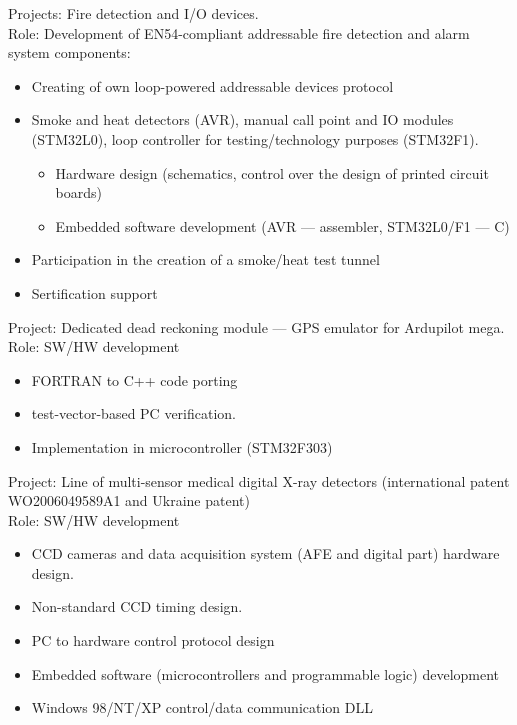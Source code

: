 \documentclass[11pt,a4paper]{moderncv}
\begin{document}
  {Projects: Fire detection and I/O devices.\\
    Role: Development of EN54-compliant addressable fire detection and alarm system components:
    \begin{itemize}
      \item Creating of own loop-powered addressable devices protocol
      \item Smoke and heat detectors (AVR), manual call point and IO modules (STM32L0), loop controller for testing/technology purposes (STM32F1).
        \begin{itemize}
          \item Hardware design (schematics, control over the design of printed circuit boards)
          \item Embedded software development (AVR --- assembler, STM32L0/F1 --- C)
        \end{itemize}
      \item Participation in the creation of a smoke/heat test tunnel
      \item Sertification support
    \end{itemize}}
  {Project: Dedicated dead reckoning module — GPS emulator for Ardupilot mega.\\
    Role: SW/HW development
    \begin{itemize}
      \item FORTRAN to C++ code porting
      \item test-vector-based PC verification.
      \item Implementation in microcontroller (STM32F303)
    \end{itemize}}
  {Project: Line of multi-sensor medical digital X-ray detectors (international patent
WO2006049589A1 and Ukraine patent)\\
    Role: SW/HW development
    \begin{itemize}
      \item CCD cameras and data acquisition system (AFE and digital part) hardware design.
      \item Non-standard CCD timing design.
      \item PC to hardware control protocol design
      \item Embedded software (microcontrollers and programmable logic) development
      \item Windows 98/NT/XP control/data communication DLL
    \end{itemize}}
\end{document}
